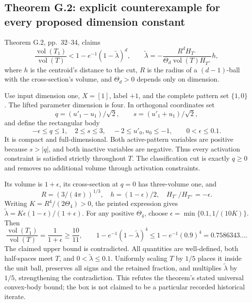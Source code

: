 \documentclass[10pt]{article}
\begin{document}
\subsection*{Theorem G.2: explicit counterexample for every proposed dimension constant}
Theorem G.2, pp. 32–34, claims \[\frac{\operatorname{vol}(T_1)}{\operatorname{vol}(T)}
 <1-e^{-1}(1-\widetilde\lambda)^d,\qquad
 \widetilde\lambda=
 -\frac{R^dH_{T^-}}{\Theta_d\operatorname{vol}(T)H_{T^+}}h,\] where \(h\) is the centroid’s distance to the cut, \(R\) is the radius of a \((d-1)\)-ball with the cross-section’s volume, and \(\Theta_d>0\) depends only on dimension.\par
Use input dimension one, \(X=[1]\), label \(+1\), and the complete pattern set \(\{1,0\}\). The lifted parameter dimension is four. In orthogonal coordinates set \[q=(u'_1-u_1)/\sqrt2,\qquad s=(u'_1+u_1)/\sqrt2,\] and define the rectangular body \[-\epsilon\le q\le1,\quad 2\le s\le3,\quad
 -2\le u'_0,u_0\le-1,\qquad 0<\epsilon\le0.1.\] It is compact and full-dimensional. Both active-pattern variables are positive because \(s>|q|\), and both inactive variables are negative. Thus every activation constraint is satisfied strictly throughout \(T\). The classification cut is exactly \(q\ge0\) and removes no additional volume through activation constraints.\par
Its volume is \(1+\epsilon\), its cross-section at \(q=0\) has three-volume one, and \[R=(3/(4\pi))^{1/3},\quad
 h=(1-\epsilon)/2,\quad
 H_{T^-}/H_{T^+}=-\epsilon.\] Writing \(K=R^4/(2\Theta_4)>0\), the printed expression gives \(\widetilde\lambda=K\epsilon(1-\epsilon)/(1+\epsilon)\). For any positive \(\Theta_4\), choose \(\epsilon=\min\{0.1,1/(10K)\}\). Then \[\frac{\operatorname{vol}(T_1)}{\operatorname{vol}(T)}
   =\frac1{1+\epsilon}\ge\frac{10}{11},
 \qquad
 1-e^{-1}(1-\widetilde\lambda)^4
   \le1-e^{-1}(0.9)^4=0.7586343\ldots .\] The claimed upper bound is contradicted. All quantities are well-defined, both half-spaces meet \(T\), and \(0<\widetilde\lambda\le0.1\). Uniformly scaling \(T\) by \(1/5\) places it inside the unit ball, preserves all signs and the retained fraction, and multiplies \(\widetilde\lambda\) by \(1/5\), strengthening the contradiction. This refutes the theorem’s stated universal convex-body bound; the box is not claimed to be a particular recorded historical iterate.\par
\end{document}
